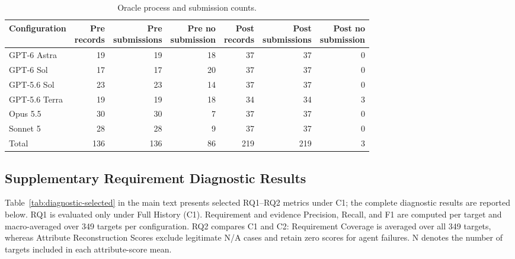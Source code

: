 \documentclass{article} %
\begin{document}
\begin{table}[htbp]
\caption{Oracle process and submission counts.}
\label{tab:oracle-submissions}
\centering\normalsize
\setlength{\tabcolsep}{3pt}
\renewcommand{\arraystretch}{1.08}
\begin{tabularx}{\linewidth}{@{}>{\raggedright\arraybackslash}Xrrrrrr@{}}
\toprule
Configuration & \shortstack[c]{Pre\\records} & \shortstack[c]{Pre\\submissions} & \shortstack[c]{Pre no\\submission} & \shortstack[c]{Post\\records} & \shortstack[c]{Post\\submissions} & \shortstack[c]{Post no\\submission} \\
\midrule
GPT-6 Astra & 19 & 19 & 18 & 37 & 37 & 0 \\
GPT-6 Sol & 17 & 17 & 20 & 37 & 37 & 0 \\
GPT-5.6 Sol & 23 & 23 & 14 & 37 & 37 & 0 \\
GPT-5.6 Terra & 19 & 19 & 18 & 34 & 34 & 3 \\
Opus 5.5 & 30 & 30 & 7 & 37 & 37 & 0 \\
Sonnet 5 & 28 & 28 & 9 & 37 & 37 & 0 \\
Total & 136 & 136 & 86 & 219 & 219 & 3 \\
\bottomrule
\end{tabularx}
\end{table}

\FloatBarrier
\subsection{Supplementary Requirement Diagnostic Results}
\label{app:e2}

Table~\ref{tab:diagnostic-selected} in the main text presents selected RQ1--RQ2 metrics under C1; the complete diagnostic results are reported below. RQ1 is evaluated only under Full History (C1). Requirement and evidence Precision, Recall, and F1 are computed per target and macro-averaged over 349 targets per configuration. RQ2 compares C1 and C2: Requirement Coverage is averaged over all 349 targets, whereas Attribute Reconstruction Scores exclude legitimate N/A cases and retain zero scores for agent failures. N denotes the number of targets included in each attribute-score mean.
\end{document}
